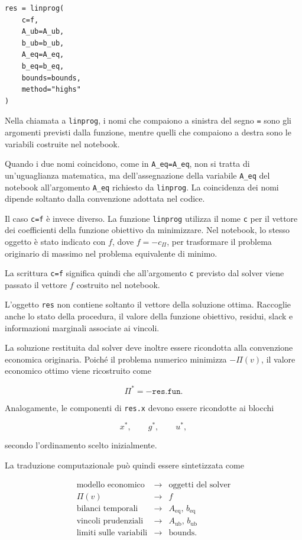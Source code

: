 \begin{verbatim}
res = linprog(
    c=f,
    A_ub=A_ub,
    b_ub=b_ub,
    A_eq=A_eq,
    b_eq=b_eq,
    bounds=bounds,
    method="highs"
)
\end{verbatim}


Nella chiamata a \texttt{linprog}, i nomi che compaiono a sinistra del segno
\texttt{=} sono gli argomenti previsti dalla funzione, mentre quelli che
compaiono a destra sono le variabili costruite nel notebook.

Quando i due nomi coincidono, come in {\verb|A_eq=A_eq|}, non si tratta di un'uguaglianza matematica, ma dell'assegnazione della
variabile \texttt{A\_eq} del notebook all'argomento \texttt{A\_eq} richiesto
da \texttt{linprog}. La coincidenza dei nomi dipende soltanto dalla
convenzione adottata nel codice.

Il caso {\verb|c=f|} \`e invece diverso. La funzione \texttt{linprog} utilizza il nome
\texttt{c} per il vettore dei coefficienti della funzione obiettivo da
minimizzare. Nel notebook, lo stesso oggetto \`e stato indicato con $f$,
dove $f=-c_{\Pi}$, per trasformare il problema originario di massimo nel problema equivalente
di minimo.

La scrittura {\verb|c=f|} significa quindi che all'argomento \texttt{c} previsto dal solver viene
passato il vettore $f$ costruito nel notebook.


L'oggetto \texttt{res} non contiene soltanto il vettore della soluzione
ottima. Raccoglie anche lo stato della procedura, il valore della funzione
obiettivo, residui, slack e informazioni marginali associate ai vincoli.

La soluzione restituita dal solver deve inoltre essere ricondotta alla
convenzione economica originaria. Poich\'e il problema numerico minimizza
$-\Pi(v)$, il valore economico ottimo viene ricostruito come

\[
\Pi^*
=
-\texttt{res.fun}.
\]

Analogamente, le componenti di \texttt{res.x} devono essere ricondotte ai
blocchi

\[
x^*,
\qquad
g^*,
\qquad
u^*,
\]

\noindent secondo l'ordinamento scelto inizialmente.

La traduzione computazionale pu\`o quindi essere sintetizzata come

\[
\begin{array}{ccc}
\text{modello economico}
&
\longrightarrow
&
\text{oggetti del solver}
\\[4pt]
\Pi(v)
&
\longrightarrow
&
f
\\[4pt]
\text{bilanci temporali}
&
\longrightarrow
&
A_{\mathrm{eq}},\,b_{\mathrm{eq}}
\\[4pt]
\text{vincoli prudenziali}
&
\longrightarrow
&
A_{\mathrm{ub}},\,b_{\mathrm{ub}}
\\[4pt]
\text{limiti sulle variabili}
&
\longrightarrow
&
\text{bounds}.
\end{array}
\]

